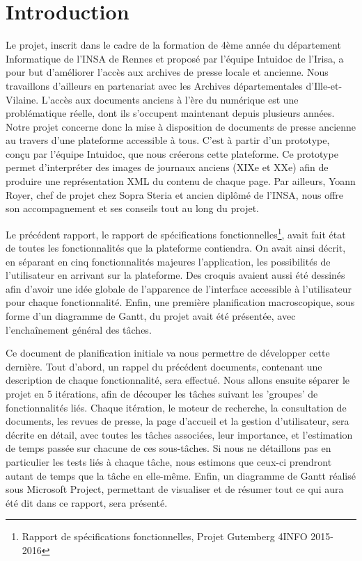\section{Introduction}
\label{sec:intro}
	
	Le projet, inscrit dans le cadre de la formation de 4ème année du département Informatique de l’INSA de Rennes et proposé par l’équipe Intuidoc de l’Irisa, a pour but d’améliorer l’accès aux archives de presse locale et ancienne. Nous travaillons d'ailleurs en partenariat avec les Archives départementales d'Ille-et-Vilaine. L'accès aux documents anciens à l'ère du numérique est une problématique réelle, dont ils s'occupent maintenant depuis plusieurs années. Notre projet concerne donc la mise à disposition de documents de presse ancienne au travers d'une plateforme accessible à tous. C'est à partir d'un prototype, conçu par l'équipe Intuidoc, que nous créerons cette plateforme. Ce prototype permet d'interpréter des images de journaux anciens (XIXe et XXe) afin de produire une représentation XML du contenu de chaque page. Par ailleurs, Yoann Royer, chef de projet chez Sopra Steria et ancien diplômé de l'INSA, nous offre son accompagnement et ses conseils tout au long du projet.

	Le précédent rapport, le rapport de spécifications fonctionnelles\footnote{Rapport de spécifications fonctionnelles, Projet Gutemberg 4INFO 2015-2016}, avait fait état de toutes les fonctionnalités que la plateforme contiendra. On avait ainsi décrit, en séparant en cinq fonctionnalités majeures l'application, les possibilités de l'utilisateur en arrivant sur la plateforme. Des croquis avaient aussi été dessinés afin d'avoir une idée globale de l'apparence de l'interface accessible à l'utilisateur pour chaque fonctionnalité. Enfin, une première planification macroscopique, sous forme d'un diagramme de Gantt, du projet avait été présentée, avec l'enchaînement général des tâches.

	Ce document de planification initiale va nous permettre de développer cette dernière. Tout d'abord, un rappel du précédent documents, contenant une description de chaque fonctionnalité, sera effectué. Nous allons ensuite séparer le projet en 5 itérations, afin de découper les tâches suivant les 'groupes' de fonctionnalités liés. Chaque itération, le moteur de recherche, la consultation de documents, les revues de presse, la page d'accueil et la gestion d'utilisateur, sera décrite en détail, avec toutes les tâches associées, leur importance, et l'estimation de temps passée sur chacune de ces sous-tâches. Si nous ne détaillons pas en particulier les tests liés à chaque tâche, nous estimons que ceux-ci prendront autant de temps que la tâche en elle-même. Enfin, un diagramme de Gantt réalisé sous Microsoft Project, permettant de visualiser et de résumer tout ce qui aura été dit dans ce rapport, sera présenté.